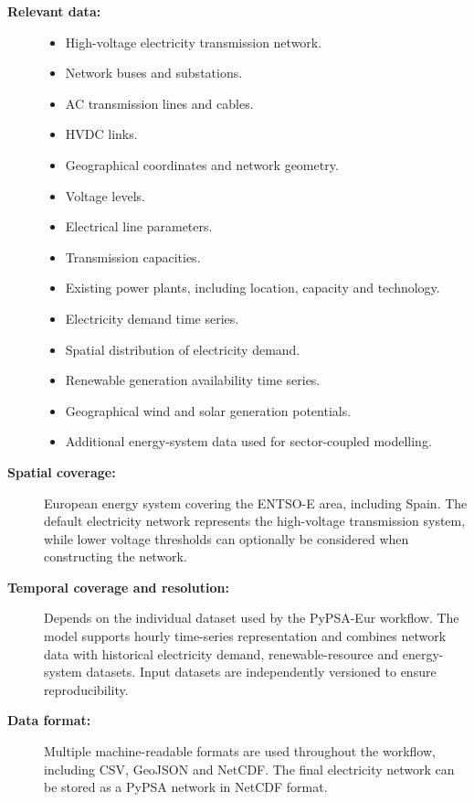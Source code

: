 \begin{description}
    \item[\textbf{Relevant data:}] \hfill
    \begin{itemize}
        \item High-voltage electricity transmission network.
        \item Network buses and substations.
        \item AC transmission lines and cables.
        \item HVDC links.
        \item Geographical coordinates and network geometry.
        \item Voltage levels.
        \item Electrical line parameters.
        \item Transmission capacities.
        \item Existing power plants, including location, capacity and
        technology.
        \item Electricity demand time series.
        \item Spatial distribution of electricity demand.
        \item Renewable generation availability time series.
        \item Geographical wind and solar generation potentials.
        \item Additional energy-system data used for sector-coupled
        modelling.
    \end{itemize}

    \item[\textbf{Spatial coverage:}]
    European energy system covering the ENTSO-E area, including Spain.
    The default electricity network represents the high-voltage
    transmission system, while lower voltage thresholds can optionally
    be considered when constructing the network.

    \item[\textbf{Temporal coverage and resolution:}]
    Depends on the individual dataset used by the PyPSA-Eur workflow.
    The model supports hourly time-series representation and combines
    network data with historical electricity demand, renewable-resource
    and energy-system datasets. Input datasets are independently
    versioned to ensure reproducibility.

    \item[\textbf{Data format:}]
    Multiple machine-readable formats are used throughout the workflow,
    including CSV, GeoJSON and NetCDF. The final electricity network can
    be stored as a PyPSA network in NetCDF format.


\end{description}
